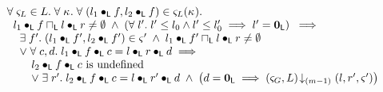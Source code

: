 \begin{definition}
\[\begin{array}{l}
%

  \hspace*{0.4cm}\for{\amod{L} \in L} \for{\ca{}} \for{(l_1 \composeL f, l_2 \composeL f) \in \amod{L}(\ca{})} \\
  \hspace*{0.6cm} l_1 \composeL f \meetL l \composeL r \not= \emptyset \;\land\; \left(\for{l'} l' \leq l_0 \land l' \leq l'_0 \implies l' = \unitL\right)  \;\implies\\
  \hspace*{0.8cm}\exsts{f'} (l_1 \composeL f', l_2 \composeL f') \in \amod{}' \;\land\; l_1 \composeL f' \meetL l \composeL r \not= \emptyset\\
	

		\hspace*{0.8cm}\lor\;\for{c, d}  l_1 \composeL f \composeL c = l \composeL r \composeL d \implies\\
		\hspace*{1cm}
		\begin{array}{l l}
			l_2 \composeL f \composeL c \text{ is undefined}\\
			\lor\; \exsts{r'} l_2 \composeL f \composeL c = l \composeL r' \composeL d \;\land\; \left( d = \unitL \implies \extendsAMUpto{\amod{G}, L}{(m-1)}{l}{r'}{\amod{}'}\right)
		\end{array}


\end{array}\]
\end{definition}
